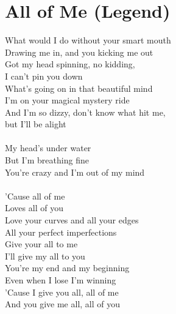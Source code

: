 \section{All of Me (Legend)}
What would I do without your smart mouth\\
Drawing me in, and you kicking me out\\
Got my head spinning, no kidding,\\
I can’t pin you down\\
What’s going on in that beautiful mind\\
I’m on your magical mystery ride\\
And I’m so dizzy, don’t know what hit me,\\
but I’ll be alight\\
\\
My head’s under water\\
But I’m breathing fine\\
You’re crazy and I’m out of my mind\\
\\
'Cause all of me\\
Loves all of you\\
Love your curves and all your edges\\
All your perfect imperfections\\
Give your all to me\\
I’ll give my all to you\\
You’re my end and my beginning\\
Even when I lose I’m winning\\
'Cause I give you all, all of me \\
And you give me all, all of you\\
